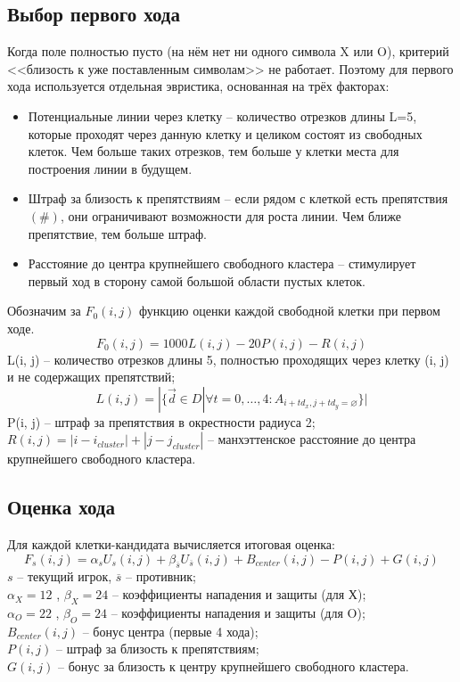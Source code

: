 \documentclass[14pt]{extreport}
\begin{document}
\subsection{Выбор первого хода}
Когда поле полностью пусто (на нём нет ни одного символа X или O), критерий <<близость к уже поставленным символам>> не работает. Поэтому для первого хода используется отдельная эвристика, основанная на трёх факторах:
\begin{itemize}
    \item Потенциальные линии через клетку -- количество отрезков длины L=5, которые проходят через данную клетку и целиком состоят из свободных клеток. Чем больше таких отрезков, тем больше у клетки места для построения линии в будущем.
    \item Штраф за близость к препятствиям -- если рядом с клеткой есть препятствия $(\#)$, они ограничивают возможности для роста линии. Чем ближе препятствие, тем больше штраф.
    \item Расстояние до центра крупнейшего свободного кластера -- стимулирует первый ход в сторону самой большой области пустых клеток.
\end{itemize}
Обозначим за $F_0(i, j)$ функцию оценки каждой свободной клетки при первом ходе.
\[ F_0(i, j) = 1000 L(i, j) - 20 P(i, j) - R(i, j)\]
L(i, j) -- количество отрезков длины 5, полностью проходящих через клетку (i, j) и не содержащих препятствий;\\
\[ L(i, j) = | \{ \vec{d} \in D | \forall t = 0, \dots , 4 : A_{i+td_x, j+td_y = \varnothing }\} |\]
P(i, j) -- штраф за препятствия в окрестности радиуса 2;\\
$R(i, j) = |i-i_{cluster}| + |j - j_{cluster}| $ -- манхэттенское расстояние до центра крупнейшего свободного кластера.\\

\subsection{Оценка хода}
Для каждой клетки-кандидата вычисляется итоговая оценка:
\[ F_s(i, j) = \alpha_s U_s(i, j) + \beta_{\overline{s}} U_{\overline{s}}(i, j) + B_{center}(i, j) - P(i, j) + G(i, j) \]
$s$ -- текущий игрок, $\overline{s}$ -- противник;\\
$\alpha_X = 12$ , $\beta_X = 24$ -- коэффициенты нападения и защиты (для Х);\\
$\alpha_O = 22$ , $\beta_O = 24$ -- коэффициенты нападения и защиты (для O);\\
$B_{center}(i, j)$ -- бонус центра (первые 4 хода);\\
$P(i, j)$ -- штраф за близость к препятствиям;\\
$G(i, j)$ -- бонус за близость к центру крупнейшего свободного кластера.
\end{document}
